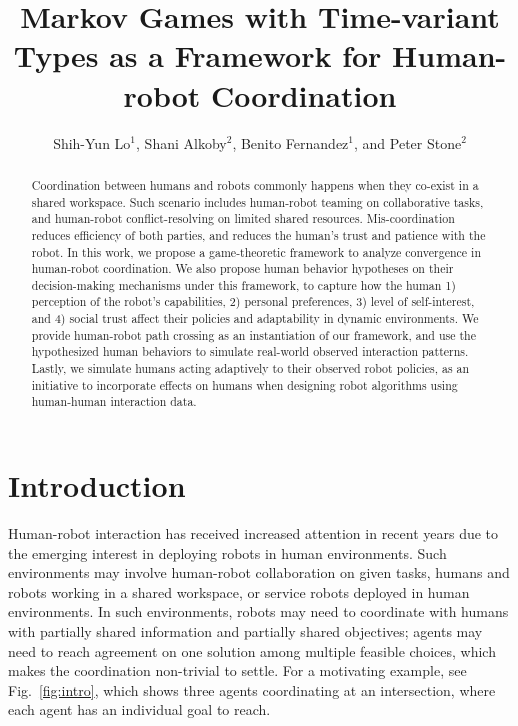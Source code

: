 \documentclass[letterpaper, 10 pt, conference]{ieeeconf}  %
\title{\LARGE \bf
Markov Games with Time-variant Types as a Framework for Human-robot Coordination
}
\author{Shih-Yun Lo$^{1}$, Shani Alkoby$^{2}$, Benito Fernandez$^{1}$, and Peter Stone$^{2}$%
}
\begin{document}
\maketitle
\thispagestyle{empty}
\pagestyle{empty}
\begin{abstract}
	Coordination between humans and robots commonly happens when they 
	co-exist in a shared workspace. Such scenario includes human-robot teaming on 
	collaborative tasks, and 
	human-robot conflict-resolving on limited shared resources. Mis-coordination 
	reduces 
	efficiency of both parties, and reduces the human's trust and patience with 
	the robot. In this work, we propose a game-theoretic framework to analyze 
	convergence in 
	human-robot coordination.
	We also propose human behavior hypotheses on their 
	decision-making mechanisms under this framework, 
	to capture how the human 1) perception of the robot's capabilities, 2) personal preferences, 3) level of self-interest, and 4) social 
	trust affect their policies and adaptability in dynamic environments. 
	We provide human-robot path crossing as an instantiation of our framework, and use the 
	hypothesized human behaviors to simulate real-world observed interaction 
	patterns. Lastly, we simulate humans acting adaptively to their observed robot 
	policies, as an initiative to incorporate effects on humans when designing 
	robot algorithms using human-human interaction data.
\end{abstract}
\vspace{-.3em}
\section{Introduction}
\vspace{-.2em}
Human-robot interaction has received increased attention in recent years due to the 
emerging interest in deploying robots in human environments. Such 
environments may involve human-robot collaboration on given tasks, 
humans and robots working in a shared workspace, or service 
robots deployed in human environments. In such environments, robots 
may need to coordinate with humans with partially shared information and 
partially shared objectives; agents may need to reach agreement on one 
solution among multiple feasible choices, which makes the coordination non-trivial to 
settle. For a motivating example, see Fig.~\ref{fig:intro}, which shows three agents coordinating at an 
intersection, where each agent has an individual goal to reach. 
\end{document}
